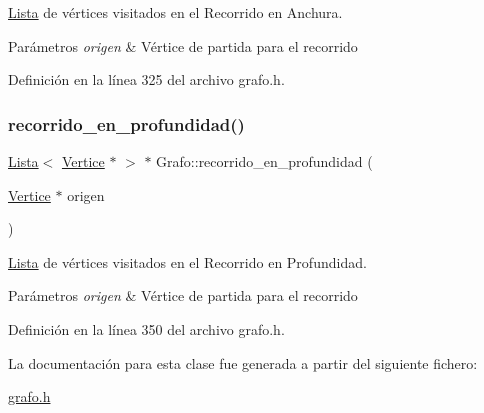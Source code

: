 \hyperlink{classLista}{Lista} de vértices visitados en el Recorrido en Anchura. 


\begin{DoxyParams}{Parámetros}
{\em origen} & Vértice de partida para el recorrido \\
\hline
\end{DoxyParams}


Definición en la línea 325 del archivo grafo.\+h.

\mbox{\label{classGrafo_ae2773db77afaab3b02a8237b93091818}} 
\subsubsection{\texorpdfstring{recorrido\+\_\+en\+\_\+profundidad()}{recorrido\_en\_profundidad()}}
{\footnotesize\ttfamily \hyperlink{classLista}{Lista}$<$ \hyperlink{classVertice}{Vertice} $\ast$ $>$ $\ast$ Grafo\+::recorrido\+\_\+en\+\_\+profundidad (\begin{DoxyParamCaption}\item[{\hyperlink{classVertice}{Vertice} $\ast$}]{origen }\end{DoxyParamCaption})}



\hyperlink{classLista}{Lista} de vértices visitados en el Recorrido en Profundidad. 


\begin{DoxyParams}{Parámetros}
{\em origen} & Vértice de partida para el recorrido \\
\hline
\end{DoxyParams}


Definición en la línea 350 del archivo grafo.\+h.



La documentación para esta clase fue generada a partir del siguiente fichero\+:\begin{DoxyCompactItemize}
\item 
\hyperlink{grafo_8h}{grafo.\+h}\end{DoxyCompactItemize}
